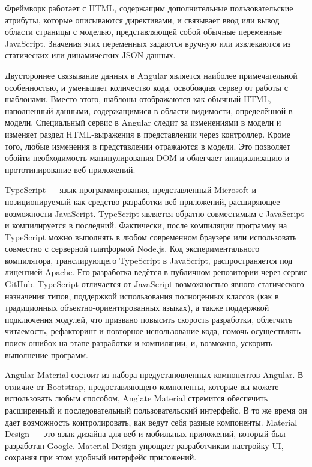 Фреймворк работает с HTML, содержащим дополнительные пользовательские атрибуты, которые описываются директивами, и связывает ввод или вывод области страницы с моделью, представляющей собой обычные переменные JavaScript.
Значения этих переменных задаются вручную или извлекаются из статических или динамических JSON-данных.

Двустороннее связывание данных в Angular является наиболее примечательной особенностью, и уменьшает количество кода, освобождая сервер от работы с шаблонами.
Вместо этого, шаблоны отображаются как обычный HTML, наполненный данными, содержащимися в области видимости, определённой в модели.
Специальный сервис в Angular следит за изменениями в модели и изменяет раздел HTML-выражения в представлении через контроллер.
Кроме того, любые изменения в представлении отражаются в модели.
Это позволяет обойти необходимость манипулирования DOM и облегчает инициализацию и прототипирование веб-приложений.

TypeScript — язык программирования, представленный Microsoft и позиционируемый как средство разработки веб-приложений, расширяющее возможности JavaScript.
TypeScript является обратно совместимым с JavaScript и компилируется в последний.
Фактически, после компиляции программу на TypeScript можно выполнять в любом современном браузере или использовать совместно с серверной платформой Node.js.
Код экспериментального компилятора, транслирующего TypeScript в JavaScript, распространяется под лицензией Apache.
Его разработка ведётся в публичном репозитории через сервис GitHub.
TypeScript отличается от JavaScript возможностью явного статического назначения типов, поддержкой использования полноценных классов (как в традиционных объектно-ориентированных языках), а также поддержкой подключения модулей, что призвано повысить скорость разработки, облегчить читаемость, рефакторинг и повторное использование кода, помочь осуществлять поиск ошибок на этапе разработки и компиляции, и, возможно, ускорить выполнение программ.

Angular Material состоит из набора предустановленных компонентов Angular.
В отличие от Bootstrap, предоставляющего компоненты, которые вы можете использовать любым способом, Anglate Material стремится обеспечить расширенный и последовательный пользовательский интерфейс.
В то же время он дает возможность контролировать, как ведут себя разные компоненты.
Material Design — это язык дизайна для веб и мобильных приложений, который был разработан Google.
Material Design упрощает разработчикам настройку \hyperlink{gloss:ui}{UI}, сохраняя при этом удобный интерфейс приложений.

